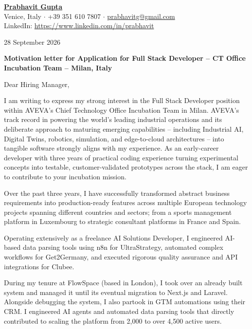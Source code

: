 \documentclass[10pt, a4paper]{article}
\begin{document}
\pagestyle{empty}

{\large\bfseries\underline{Prabhavit Gupta}}\\[3pt]
Venice, Italy $\cdot$ +39 351 610 7807 $\cdot$ \href{mailto:prabhavitg@gmail.com}{prabhavitg@gmail.com}\\
LinkedIn: \href{https://www.linkedin.com/in/prabhavit}{https://www.linkedin.com/in/prabhavit}

\vspace{12pt}
28 September 2026

\vspace{10pt}
\textbf{Motivation letter for Application for Full Stack Developer -- CT Office Incubation Team -- Milan, Italy}

\vspace{10pt}
Dear Hiring Manager,

I am writing to express my strong interest in the Full Stack Developer position within AVEVA's Chief Technology Office Incubation Team in Milan. AVEVA's track record in powering the world's leading industrial operations and its deliberate approach to maturing emerging capabilities -- including Industrial AI, Digital Twins, robotics, simulation, and edge-to-cloud architectures -- into tangible software strongly aligns with my experience. As an early-career developer with three years of practical coding experience turning experimental concepts into testable, customer-validated prototypes across the stack, I am eager to contribute to your incubation mission.

Over the past three years, I have successfully transformed abstract business requirements into production-ready features across multiple European technology projects spanning different countries and sectors; from a sports management platform in Luxembourg to strategic consultant platforms in France and Spain.

Operating extensively as a freelance AI Solutions Developer, I engineered AI-based data parsing tools using n8n for UltraStrategy, automated complex workflows for Get2Germany, and executed rigorous quality assurance and API integrations for Clubee.

During my tenure at FlowSpace (based in London), I took over an already built system and managed it until its eventual migration to Next.js and Laravel. Alongside debugging the system, I also partook in GTM automations using their CRM. I engineered AI agents and automated data parsing tools that directly contributed to scaling the platform from 2,000 to over 4,500 active users.
\end{document}
